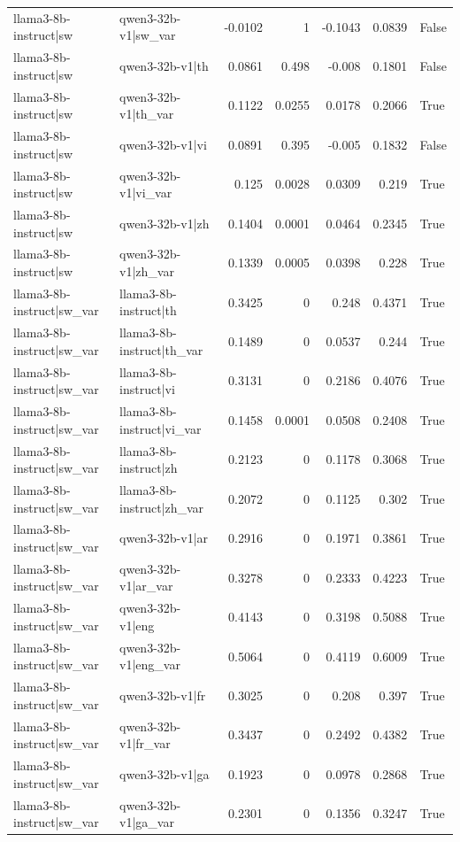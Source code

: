 \begin{table}
\begin{tabular}{l l r r r r l}
llama3-8b-instruct|sw & qwen3-32b-v1|sw_var & -0.0102 & 1 & -0.1043 & 0.0839 & False \\
llama3-8b-instruct|sw & qwen3-32b-v1|th & 0.0861 & 0.498 & -0.008 & 0.1801 & False \\
llama3-8b-instruct|sw & qwen3-32b-v1|th_var & 0.1122 & 0.0255 & 0.0178 & 0.2066 & True \\
llama3-8b-instruct|sw & qwen3-32b-v1|vi & 0.0891 & 0.395 & -0.005 & 0.1832 & False \\
llama3-8b-instruct|sw & qwen3-32b-v1|vi_var & 0.125 & 0.0028 & 0.0309 & 0.219 & True \\
llama3-8b-instruct|sw & qwen3-32b-v1|zh & 0.1404 & 0.0001 & 0.0464 & 0.2345 & True \\
llama3-8b-instruct|sw & qwen3-32b-v1|zh_var & 0.1339 & 0.0005 & 0.0398 & 0.228 & True \\
llama3-8b-instruct|sw_var & llama3-8b-instruct|th & 0.3425 & 0 & 0.248 & 0.4371 & True \\
llama3-8b-instruct|sw_var & llama3-8b-instruct|th_var & 0.1489 & 0 & 0.0537 & 0.244 & True \\
llama3-8b-instruct|sw_var & llama3-8b-instruct|vi & 0.3131 & 0 & 0.2186 & 0.4076 & True \\
llama3-8b-instruct|sw_var & llama3-8b-instruct|vi_var & 0.1458 & 0.0001 & 0.0508 & 0.2408 & True \\
llama3-8b-instruct|sw_var & llama3-8b-instruct|zh & 0.2123 & 0 & 0.1178 & 0.3068 & True \\
llama3-8b-instruct|sw_var & llama3-8b-instruct|zh_var & 0.2072 & 0 & 0.1125 & 0.302 & True \\
llama3-8b-instruct|sw_var & qwen3-32b-v1|ar & 0.2916 & 0 & 0.1971 & 0.3861 & True \\
llama3-8b-instruct|sw_var & qwen3-32b-v1|ar_var & 0.3278 & 0 & 0.2333 & 0.4223 & True \\
llama3-8b-instruct|sw_var & qwen3-32b-v1|eng & 0.4143 & 0 & 0.3198 & 0.5088 & True \\
llama3-8b-instruct|sw_var & qwen3-32b-v1|eng_var & 0.5064 & 0 & 0.4119 & 0.6009 & True \\
llama3-8b-instruct|sw_var & qwen3-32b-v1|fr & 0.3025 & 0 & 0.208 & 0.397 & True \\
llama3-8b-instruct|sw_var & qwen3-32b-v1|fr_var & 0.3437 & 0 & 0.2492 & 0.4382 & True \\
llama3-8b-instruct|sw_var & qwen3-32b-v1|ga & 0.1923 & 0 & 0.0978 & 0.2868 & True \\
llama3-8b-instruct|sw_var & qwen3-32b-v1|ga_var & 0.2301 & 0 & 0.1356 & 0.3247 & True \\

\end{tabular}
\end{table}
